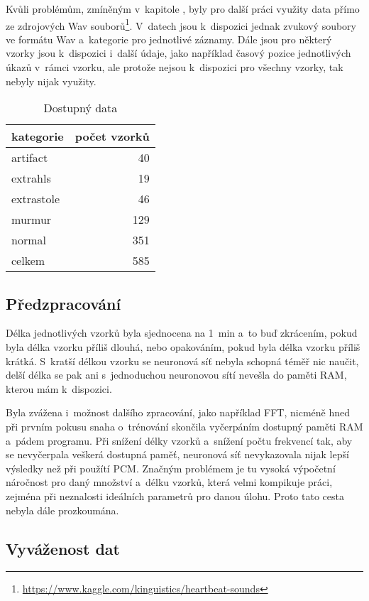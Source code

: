 \documentclass[\languages,a4paper,12pt]{article}
\begin{document}
Kvůli problémům, zmíněným v kapitole , byly pro další práci využity data přímo ze zdrojových Wav souborů\footnote{\url{https://www.kaggle.com/kinguistics/heartbeat-sounds}}.
V datech jsou k dispozici jednak zvukový soubory ve formátu Wav a kategorie pro jednotlivé záznamy.
Dále jsou pro některý vzorky jsou k dispozici i další údaje, jako například časový pozice jednotlivých úkazů v rámci vzorku, ale protože nejsou k dispozici pro všechny vzorky, tak nebyly nijak využity.

\begin{table}[htbp]
\centering
\begin{tabular}{ l r }
	kategorie  & počet vzorků \\
	\hline
	artifact   & \num{    40} \\
	extrahls   & \num{    19} \\
	extrastole & \num{    46} \\
	murmur     & \num{   129} \\
	normal     & \num{   351} \\
	\hline
	celkem     & \num{   585} \\
\end{tabular}
\caption{Dostupný data}
\end{table}

\subsection{Předzpracování}

Délka jednotlivých vzorků byla sjednocena na \SI{1}{\minute} a to buď zkrácením, pokud byla délka vzorku příliš dlouhá, nebo opakováním, pokud byla délka vzorku příliš krátká.
S kratší délkou vzorku se neuronová síť nebyla schopná téměř nic naučit, delší délka se pak ani s jednoduchou neuronovou sítí nevešla do paměti RAM, kterou mám k dispozici.

Byla zvážena i možnost dalšího zpracování, jako například FFT, nicméně hned při prvním pokusu snaha o trénování skončila vyčerpáním dostupný paměti RAM a pádem programu.
Při snížení délky vzorků a snížení počtu frekvencí tak, aby se nevyčerpala veškerá dostupná paměť, neuronová síť nevykazovala nijak lepší výsledky než při použítí PCM.
Značným problémem je tu vysoká výpočetní náročnost pro daný množství a délku vzorků, která velmi kompikuje práci, zejména při neznalosti ideálních parametrů pro danou úlohu.
Proto tato cesta nebyla dále prozkoumána.

\subsection{Vyváženost dat}\label{vyvazenost-dat}
\end{document}
